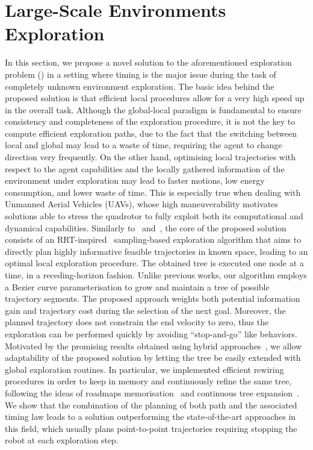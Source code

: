 \section{Large-Scale Environments Exploration}%
\label{SEC:EXPLORATION-LARGE-SCALE}
In this section, we propose a novel solution to the aforementioned exploration problem ()
in a setting where timing is the major issue during the task of completely unknown environment exploration. The basic idea behind the
proposed solution is that efficient local procedures allow for a very high speed up in the overall task. Although the global-local
paradigm is fundamental to ensure consistency and completeness of the exploration procedure, it is not the key to compute efficient 
exploration paths, due to the fact that the switching between local and global may lead to a waste of time, requiring the agent 
to change direction very frequently. On the other hand, optimising local trajectories with respect to the agent capabilities and
the locally gathered information of the environment under exploration may lead to faster motions, low energy consumption, and lower
waste of time. This is especially true when dealing with Unmanned Aerial Vehicles (UAVs), whose high maneuverability motivates solutions
able to stress the quadrotor to fully exploit both its computational and dynamical capabilities.
Similarly to~\cite{selin2019efficient} and~\cite{bircher2016receding}, the core of the proposed solution consists of an RRT-inspired~\cite{lavalle1998rapidly}
sampling-based exploration algorithm that aims to directly plan highly informative feasible trajectories in known space, leading to an
optimal local exploration procedure. The obtained tree is executed one node at a time, in a receding-horizon fashion.
Unlike previous works, our algorithm employs a B\acuteacc ezier curve parameterisation to grow and maintain a tree of possible trajectory
segments. The proposed approach weights both potential information gain and trajectory cost during the selection of the next goal.
Moreover, the planned trajectory does not constrain the end velocity to zero, thus the exploration can be performed quickly
by avoiding ``stop-and-go'' like behaviors. Motivated by the promising results obtained using hybrid approaches~\cite{selin2019efficient},
we allow adaptability of the proposed solution by letting the tree be easily extended with global exploration routines.
In particular, we implemented efficient rewiring procedures in order to keep in memory and continuously refine the same tree, following
the ideas of roadmaps memorisation~\cite{xu2021autonomous} and continuous tree expansion~\cite{schmid2020efficient}.
We show that the combination of the planning of both path and the associated timing law leads to a solution outperforming the state-of-the-art approaches
in this field, which usually plans point-to-point trajectories requiring stopping the robot at each exploration step.

